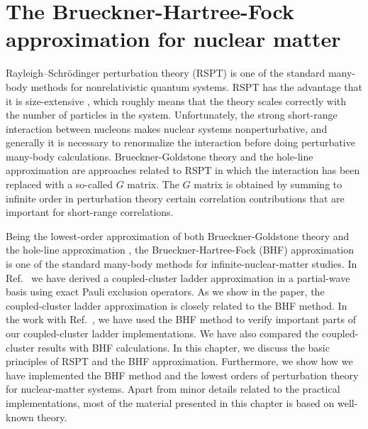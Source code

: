 \documentclass[a4paper,12pt]{report}
\begin{document}


\chapter{The Brueckner-Hartree-Fock approximation for nuclear matter} \label{ch:mbpt}

Rayleigh--Schr{\"o}dinger perturbation theory (RSPT) \cite{bartlett_book} 
is one of the standard many-body methods for nonrelativistic quantum
systems. RSPT has the advantage that it is size-extensive 
\cite{bartlett_book}, which roughly means that the theory scales 
correctly with the number of particles in the system. Unfortunately, 
the strong short-range interaction between nucleons makes nuclear 
systems nonperturbative, and generally it is necessary to renormalize 
the interaction before doing perturbative many-body calculations. 
Brueckner-Goldstone theory and the hole-line approximation 
\cite{day1967,day1978} are approaches related to RSPT in which the 
interaction has been replaced with a so-called $G$ matrix. The $G$ matrix 
is obtained by summing 
to infinite order in perturbation theory certain correlation 
contributions that are important for short-range correlations.

Being the lowest-order approximation of both Brueckner-Goldstone theory
and the hole-line approximation \cite{day1967,day1978}, the 
Brueckner-Hartree-Fock (BHF) 
approximation \cite{brueckner1954,brueckner_levinson,brueckner,
brueckner_gammel,day1967,bethe1971,day1978,jackson1983,baldo1990,
song,li2006,baldo2012} is one of the standard many-body methods 
for infinite-nuclear-matter studies.  
In Ref.~\cite{baardsen} we have derived a coupled-cluster ladder
approximation in a partial-wave basis using exact Pauli exclusion
operators. As we show in the paper, the coupled-cluster ladder 
approximation is closely related to the BHF method. In the work with
Ref.~\cite{baardsen}, we have used the BHF method to verify important 
parts of our coupled-cluster ladder implementations. 
We have also compared the coupled-cluster results with BHF calculations. 
In this chapter, we discuss the basic principles of RSPT and 
the BHF approximation. Furthermore, we show how we have implemented
the BHF method and the lowest orders of perturbation theory for 
nuclear-matter systems. Apart from minor details related to the 
practical implementations, most of the material presented in this 
chapter is based on well-known theory.
 
\end{document}
